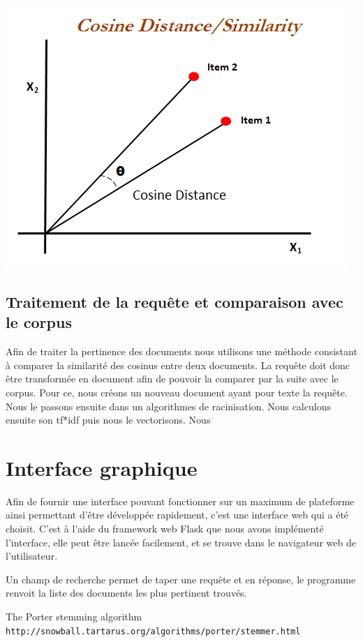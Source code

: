 \documentclass[11pt]{article}
\begin{document}
\begin{center}
\includegraphics[scale=0.9]{cosinus}
\end{center}

\subsection{Traitement de la requête et comparaison avec le corpus}
Afin de traiter la pertinence des documents nous utilisons une méthode consistant à comparer la similarité des cosinus entre deux documents. 
La requête doit donc être transformée en document afin de pouvoir la comparer par la suite avec le corpus. 
Pour ce, nous créons un nouveau document ayant pour texte la requête. Nous le passons ensuite dans un algorithmes de racinisation. 
Nous calculons ensuite son tf*idf puis nous le vectorisons. Nous 

\pagebreak
\section{Interface graphique}
Afin de fournir une interface pouvant fonctionner sur un maximum de plateforme ainsi permettant d'être développée rapidement, c'est une interface web qui a été choisit.
C'est à l'aide du framework web Flask que nous avons implémenté l'interface, elle peut être lancée facilement, et se trouve dans le navigateur web de l'utilisateur.

Un champ de recherche permet de taper une requête et en réponse, le programme renvoit la liste des documents les plus pertinent trouvés. 

\pagebreak

\begin{thebibliography}{9}

    The Porter stemming algorithm
    \\\texttt{http://snowball.tartarus.org/algorithms/porter/stemmer.html}

\end{thebibliography}
\end{document}
